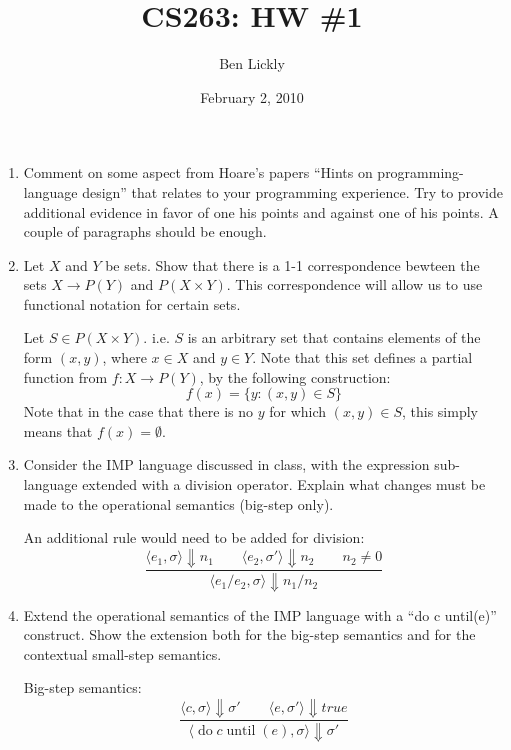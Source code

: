 \documentclass{article}
\title{CS263: HW \#1}
\author{Ben Lickly}
\date{February 2, 2010}
\begin{document}
\maketitle
\begin{enumerate}
  \item Comment on some aspect from Hoare's papers ``Hints on
  programming-language design'' that relates to your programming experience. Try
  to provide additional evidence in favor of one his points and against one of
  his points. A couple of paragraphs should be enough.
  
  
  \item Let $X$ and $Y$ be sets. Show that there is a 1-1 correspondence bewteen
  the sets $X \rightarrow P(Y)$ and $P(X \times Y )$. This correspondence will
  allow us to use functional notation for certain sets.
  
  Let $S \in P(X \times Y)$. i.e. $S$ is an arbitrary set that contains elements
  of the form $(x,y)$, where $x \in X$ and $y \in Y$.  Note that this set
  defines a partial function from $f : X \rightarrow P(Y)$, by the following
  construction:
  \[
  f(x) = \{ y : (x,y) \in S \}
  \]
  Note that in the case that there is no $y$ for which $(x,y) \in S$, this
  simply means that $f(x) = \emptyset$.
  
  \item Consider the IMP language discussed in class, with the expression
  sub-language extended with a division operator. Explain what changes must be
  made to the operational semantics (big-step only).
  
  An additional rule would need to be added for division:
  \[\frac{
  \langle e_1, \sigma \rangle \Downarrow n_1   \qquad
  \langle e_2, \sigma' \rangle \Downarrow n_2  \qquad
  n_2 \ne 0 }
  {\langle e_1 / e_2, \sigma \rangle \Downarrow n_1 / n_2}
  \]
  
  \item Extend the operational semantics of the IMP language with a ``do c
  until(e)'' construct. Show the extension both for the big-step semantics and
  for the contextual small-step semantics.
  \newcommand{\dountil}[2]{\operatorname{do} #1 \operatorname{until}(#2)}
  \newcommand{\ifthenelse}[3]{\operatorname{if} #1 \operatorname{then} #2 \operatorname{else} #3}
  
  Big-step semantics:
  \[\frac{
  \langle c, \sigma \rangle \Downarrow \sigma'   \qquad
  \langle e, \sigma' \rangle \Downarrow true }
  {\langle \dountil{c}{e}, \sigma \rangle \Downarrow \sigma'}
  \]


\end{enumerate}
\end{document}
